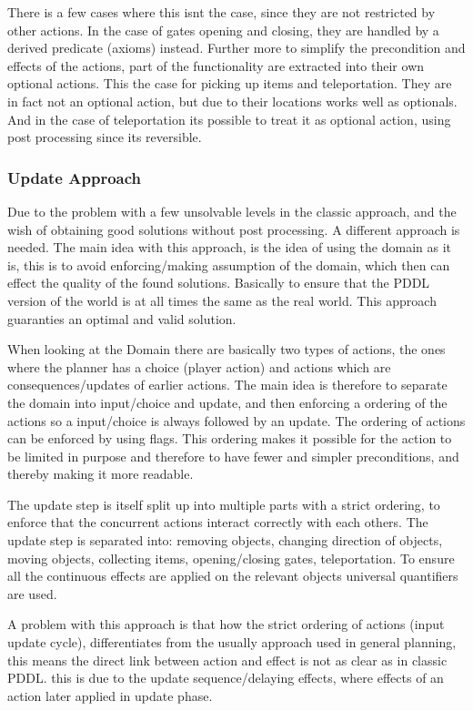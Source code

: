 		There is a few cases where this isnt the case, since they are not restricted by other actions. In the case of gates opening and closing, they are handled by a derived predicate (axioms) instead. 
		Further more to simplify the precondition and effects of the actions, part of the functionality are extracted into their own optional actions. This the case for picking up items and teleportation. They are in fact not an optional action, but due to their locations works well as optionals. And in the case of teleportation its possible to treat it as optional action, using post processing since its reversible.
		
		\subsubsection{Update Approach}
		Due to the problem with a few unsolvable levels in the classic approach, and the wish of obtaining good solutions without post processing. A different approach is needed. The main idea with this approach, is the idea of using the domain as it is, this is to avoid enforcing/making assumption of the domain, which then can effect the quality of the found solutions. Basically to ensure that the PDDL version of the world is at all times the same as the real world. This approach guaranties an optimal and valid solution.
		
		When looking at the Domain there are basically two types of actions, the ones where the planner has a choice (player action) and actions which are consequences/updates of earlier actions. The main idea is therefore to separate the domain into input/choice and update, and then enforcing a ordering of the actions so a input/choice is always followed by an update. The ordering of actions can be enforced by using flags.	This ordering makes it possible for the action to be limited in purpose and therefore to have fewer and simpler preconditions, and thereby making it more readable.
		
		The update step is itself split up into multiple parts with a strict ordering, to enforce that the concurrent actions interact correctly with each others. The update step is separated into: removing objects, changing direction of objects, moving objects, collecting items, opening/closing gates, teleportation. To ensure all the continuous effects are applied on the relevant objects universal quantifiers are used. 
		
		A problem with this approach is that how the strict ordering of actions (input update cycle), differentiates from the usually approach used in general planning, this means the direct link between action and effect is not as clear as in classic PDDL. this is due to the update sequence/delaying effects, where effects of an action later applied in update phase. 
		
	

	
	

